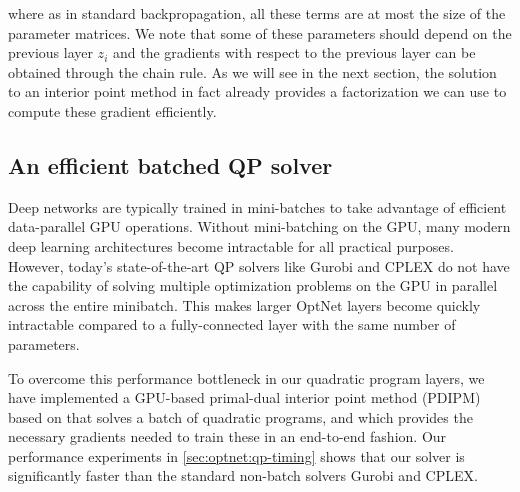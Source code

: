 where as in standard backpropagation, all these terms are at most the size of
the parameter matrices.
We note that some of these parameters should depend on the previous layer
$z_i$ and the gradients with respect to the previous layer can
be obtained through the chain rule.
As we will see in the next section, the solution to an
interior point method in fact already provides a factorization we can use to
compute these gradient efficiently.

\subsection{An efficient batched QP solver}
\label{sec:optnet:qp-solver}

Deep networks are typically trained in mini-batches to take advantage
of efficient data-parallel GPU operations.
Without mini-batching on the GPU, many modern deep learning
architectures become intractable for all practical purposes.
However, today's state-of-the-art QP solvers like Gurobi and CPLEX
do not have the capability of solving multiple optimization
problems on the GPU in parallel across the entire minibatch.
This makes larger OptNet layers become quickly intractable
compared to a fully-connected layer with the same number of parameters.

To overcome this performance bottleneck in our quadratic program layers,
we have implemented a GPU-based primal-dual interior point
method (PDIPM) based on \citet{mattingley2012cvxgen}
that solves a batch of quadratic programs, and which provides the necessary
gradients needed to train these in an end-to-end fashion.
Our performance experiments in \cref{sec:optnet:qp-timing} shows
that our solver is significantly faster than the standard
non-batch solvers Gurobi and CPLEX.


